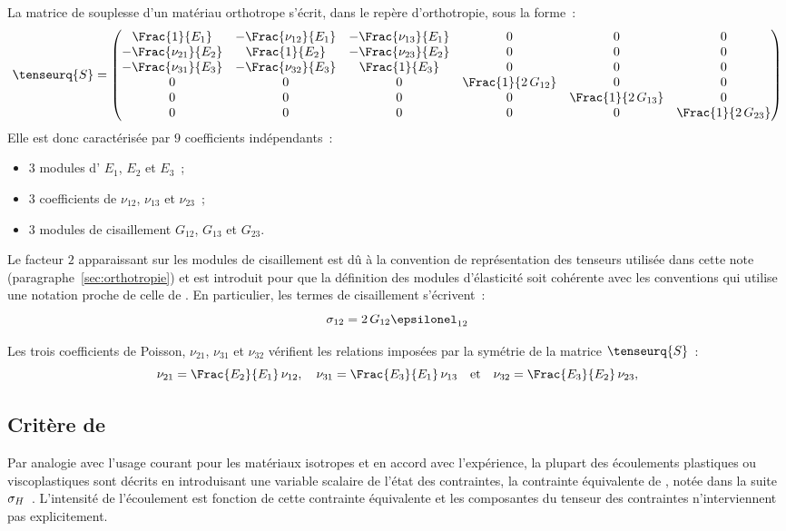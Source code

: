 La matrice de souplesse d'un matériau orthotrope s'écrit, dans le
repère d'orthotropie, sous la forme~:
\begin{equation}
  \label{eq:S}
  \tenseurq{S}=
  \begin{pmatrix}
    \Frac{1}{E_1}&-\Frac{\nu_{12}}{E_1}&-\Frac{\nu_{13}}{E_1}&0&0&0\\
    -\Frac{\nu_{21}}{E_2}&\Frac{1}{E_2}&-\Frac{\nu_{23}}{E_2}&0&0&0\\
    -\Frac{\nu_{31}}{E_3}&-\Frac{\nu_{32}}{E_3}&\Frac{1}{E_3}&0&0&0\\
    0&0&0&\Frac{1}{2\,G_{12}}&0&0\\
    0&0&0&0&\Frac{1}{2\,G_{13}}&0\\
    0&0&0&0&0&\Frac{1}{2\,G_{23}}\\
  \end{pmatrix}
\end{equation}
Elle est donc caractérisée par \(9\) coefficients indépendants~:
\begin{itemize}
\item \(3\) modules d' $E_1$, $E_2$ et $E_3$~;
\item \(3\) coefficients de  $\nu_{12}$, $\nu_{13}$ et
  $\nu_{23}$~;
\item \(3\) modules de cisaillement $G_{12}$, $G_{13}$ et $G_{23}$.
\end{itemize}

Le facteur \(2\) apparaissant sur les modules de cisaillement est dû à
la convention de représentation des tenseurs utilisée dans cette note
(paragraphe~\ref{sec:orthotropie}) et est introduit pour que la
définition des modules d'élasticité soit cohérente avec les conventions
\castem{} qui utilise une notation proche de celle de . En
particulier, les termes de cisaillement s'écrivent~:
\[
\sigma_{12} = 2\,G_{12}\epsilonel_{12}
\]

Les trois coefficients de Poisson, $\nu_{21}$, $\nu_{31}$ et
$\nu_{32}$ vérifient les relations imposées par la symétrie de la
matrice $\tenseurq{S}$~:
\[
\nu_{21}=\Frac{E_2}{E_1}\,\nu_{12}
,\quad
\nu_{31}=\Frac{E_3}{E_1}\,\nu_{13}
\quad\text{et}\quad
\nu_{32}=\Frac{E_3}{E_2}\,\nu_{23}
,\]

\subsection{Critère de }
\label{sec:critere-de-nomhill}

Par analogie avec l'usage courant pour les matériaux isotropes et en
accord avec l'expérience, la plupart des écoulements plastiques ou
viscoplastiques sont décrits en introduisant une variable scalaire de
l'état des contraintes, la contrainte équivalente de , notée
dans la suite \(\sigma_{H}\)~\cite{cha_1996,caill_98}. L'intensité de
l'écoulement est fonction de cette contrainte équivalente et les
composantes du tenseur des contraintes n'interviennent pas
explicitement.

